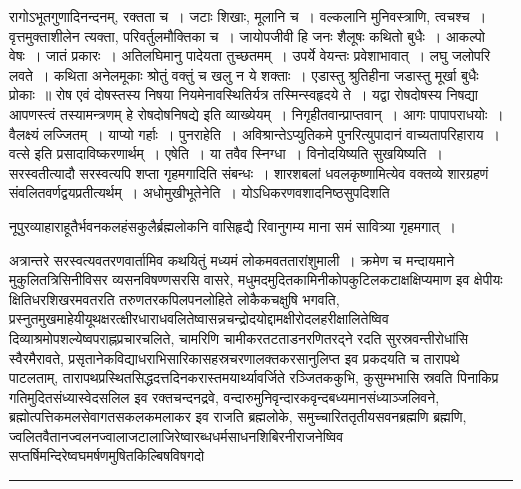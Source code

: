 \documentclass[11pt, openany]{book}
\begin{document}
\noindent
{\s रागोऽभूतगुणादिनन्दनम्, रक्तता च~। जटाः शिखाः, मूलानि च~। वल्कलानि मुनिवस्त्राणि, त्वचश्च~। वृत्तमुक्ताशीलेन त्यक्ता, परिवर्तुलमौक्तिका च~। {\qt जायोपजीवी हि जनः शैलूषः कथितो बुधैः}~। आकल्पो वेषः~। जातं प्रकारः~। अतिलघिमानु पादेयता तुच्छतमम्~। उपर्ये वेयन्तः प्रवेशाभावात्~। लघु जलोपरि लवते~। {\qt कथिता अनेलमूकाः श्रोतुं वक्तुं च खलु न ये शक्ताः~। एडास्तु श्रुतिहीना जडास्तु मूर्खा बुधैः प्रोकाः}~॥ रोष एवं दोषस्तस्य निषया नियमेनावस्थितिर्यत्र तस्मिन्स्वहृदये ते~। यद्वा रोषदोषस्य निषद्या आपणस्त्वं तस्यामन्त्रणम् हे रोषदोषनिषद्ये इति व्याख्येयम्~। निगृहीतवान्प्राप्तवान्~। {\qt आगः पापापराधयोः}~। वैलक्ष्यं लज्जितम्~। याप्यो गर्हाः~। {\qtt पुनराहेति}~। अविश्रान्तेऽप्युतिकमे पुनरित्युपादानं वाच्यतापरिहाराय~। वत्से इति प्रसादाविष्करणार्थम्~। {\qtt एषेति}~। या तवैव स्निग्धा~। विनोदयिष्यति सुखयिष्यति~। सरस्वतीत्यादौ सरस्वत्यपि शप्ता गृहमगादिति संबन्धः~। शारशबलां धवलकृष्णामित्येव वक्तव्ये शारग्रहणं संवलितवर्णद्वयप्रतीत्यर्थम्~। {\qtt अधोमुखीभूतेनेति}~। योऽधिकरणवशादनिष्ठसुपदिशति}

\newpage

\noindent
नूपुरव्याहाराहूतैर्भवनकलहंसकुलैर्ब्रह्मलोकनि वासिहृद्यै रिवानुगम्य माना समं सावित्र्या गृहमगात्~।

अत्रान्तरे सरस्वत्यवतरणवार्तामिव कथयितुं मध्यमं लोकमवततारांशुमाली~। क्रमेण च मन्दायमाने मुकुलितत्रिसिनीविसर व्यसनविषण्णसरसि वासरे, मधुमदमुदितकामिनीकोपकुटिलकटाक्षक्षिप्यमाण इव क्षेपीयः क्षितिधरशिखरमवतरति तरुणतरकपिलपनलोहिते लोकैकचक्षुषि भगवति, प्रस्नुतमुखमाहेयीयूथक्षरत्क्षीरधाराधवलितेष्वासन्नचन्द्रोदयोद्दामक्षीरोदलहरीक्षालितेष्विव दिव्याश्रमोपशल्येष्वपराह्नप्रचारचलिते, चामरिणि चामीकरतटताडनरणितरद्ने रदति सुरस्रवन्तीरोधांसि स्वैरमैरावते, प्रसृतानेकविद्याधराभिसारिकासहस्रचरणालक्तकरसानुलिप्त इव प्रकदयति च तारापथे पाटलताम्, तारापथप्रस्थितसिद्धदत्तदिनकरास्तमयार्थ्यावर्जिते रञ्जितककुभि, कुसुम्भभासि स्रवति पिनाकिप्र गतिमुदितसंध्यास्वेदसलिल इव रक्तचन्दनद्रवे, वन्दारुमुनिवृन्दारकवृन्दबध्यमानसंध्याञ्जलिवने, ब्रह्मोत्पत्तिकमलसेवागतसकलकमलाकर इव राजति ब्रह्मलोके, समुच्चारिततृतीयसवनब्रह्मणि ब्रह्मणि, ज्वलितवैतानज्वलनज्वालाजटालाजिरेष्वारब्धधर्मसाधनशिबिरनीराजनेष्विव सप्तर्षिमन्दिरेष्वघमर्षणमुषितकिल्बिषविषगदो\textendash

\vspace{2mm}
\hrule
\end{document}
